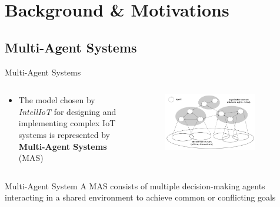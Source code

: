 \section{Background \& Motivations}

\subsection{Multi-Agent Systems}
\begin{frame}{Multi-Agent Systems}
    \begin{columns}
        \begin{column}{0.45\textwidth}
            \begin{itemize}
                \item The model chosen by \emph{IntellIoT} for designing and implementing complex IoT systems is represented by \textbf{Multi-Agent Systems} (MAS)
            \end{itemize}
        \end{column}
        \begin{column}{0.55\textwidth}
            \begin{figure}
                \centering
                \includegraphics[width=0.8\textwidth]{images/multi-agent-systems.png}
            \end{figure}
        \end{column}
    \end{columns}

    \vspace{0.5cm}

    \begin{block}{Multi-Agent System}
        A MAS consists of multiple decision-making agents interacting in a shared environment to achieve common or conflicting goals~\cite{turing}
    \end{block}
\end{frame}

